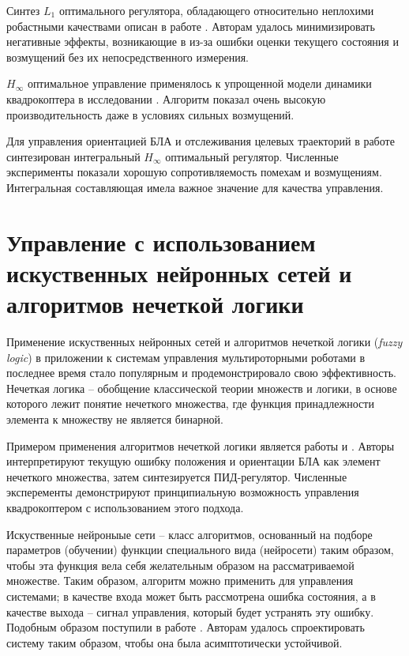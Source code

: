 Синтез $L_1$ оптимального регулятора, обладающего относительно неплохими робастными качествами описан в работе \cite{Satici01}. Авторам удалось минимизировать негативные эффекты, возникающие в из-за ошибки оценки текущего состояния и возмущений без их непосредственного измерения.

$H_{\infty}$ оптимальное управление применялось к упрощенной модели динамики квадрокоптера в исследовании \cite{Falkenberg01}. Алгоритм показал очень высокую производительность даже в условиях сильных возмущений.

Для управления ориентацией БЛА и отслеживания целевых траекторий в работе \cite{Raffo01} синтезирован интегральный $H_{\infty}$ оптимальный регулятор. Численные эксперименты показали хорошую сопротивляемость помехам и возмущениям. Интегральная составляющая имела важное значение для качества управления.

\section{Управление с использованием искуственных нейронных сетей и алгоритмов нечеткой логики}

Применение искуственных нейронных сетей и алгоритмов нечеткой логики (\textit{fuzzy logic}) в приложении к системам управления мультироторными роботами в последнее время стало популярным и продемонстрировало свою эффективность. Нечеткая логика  -- обобщение классической теории множеств и логики, в основе которого лежит понятие нечеткого множества, где функция принадлежности элемента к множеству не является бинарной.

Примером применения алгоритмов нечеткой логики является работы \cite{Dierks01} и \cite{Santos01}. Авторы интерпретируют текущую ошибку положения и ориентации БЛА как элемент нечеткого множества, затем синтезируется ПИД-регулятор. Численные эксперементы демонстрируют принципиальную возможность управления квадрокоптером с использованием этого подхода.

Искуственные нейроныые сети -- класс алгоритмов, основанный на подборе параметров (обучении) функции специального вида (нейросети) таким образом, чтобы эта функция вела себя желательным образом на рассматриваемой множестве. Таким образом, алгоритм можно применить для управления системами; в качестве входа может быть рассмотрена ошибка состояния, а в качестве выхода -- сигнал управления, который будет устранять эту ошибку. Подобным образом поступили в работе \cite{Nicol01}. Авторам удалось спроектировать систему таким образом, чтобы она была асимптотически устойчивой.

